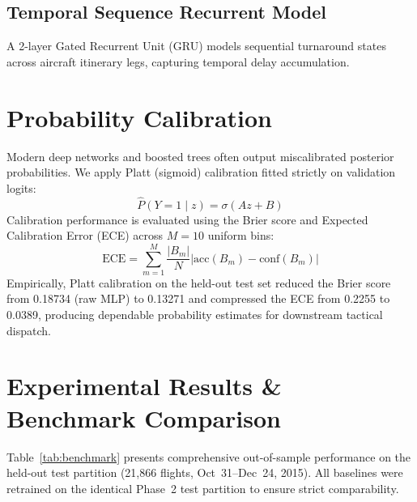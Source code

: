\documentclass[conference]{IEEEtran}
\begin{document}
\subsection{Temporal Sequence Recurrent Model}
A 2-layer Gated Recurrent Unit (GRU) models sequential turnaround states across aircraft itinerary legs, capturing temporal delay accumulation.

\section{Probability Calibration}
Modern deep networks and boosted trees often output miscalibrated posterior probabilities. We apply Platt (sigmoid) calibration fitted strictly on validation logits:
\begin{equation}
\hat{P}(Y=1 \mid z) = \sigma(A z + B)
\end{equation}
Calibration performance is evaluated using the Brier score and Expected Calibration Error (ECE) across $M=10$ uniform bins:
\begin{equation}
\text{ECE} = \sum_{m=1}^M \frac{|B_m|}{N} \left| \text{acc}(B_m) - \text{conf}(B_m) \right|
\end{equation}
Empirically, Platt calibration on the held-out test set reduced the Brier score from \mbox{0.18734} (raw MLP) to \mbox{0.13271} and compressed the ECE from \mbox{0.2255} to \mbox{0.0389}, producing dependable probability estimates for downstream tactical dispatch.

\section{Experimental Results \& Benchmark Comparison}
Table~\ref{tab:benchmark} presents comprehensive out-of-sample performance on the held-out test partition (21,866 flights, Oct~31--Dec~24, 2015). All baselines were retrained on the identical Phase~2 test partition to ensure strict comparability.
\end{document}
